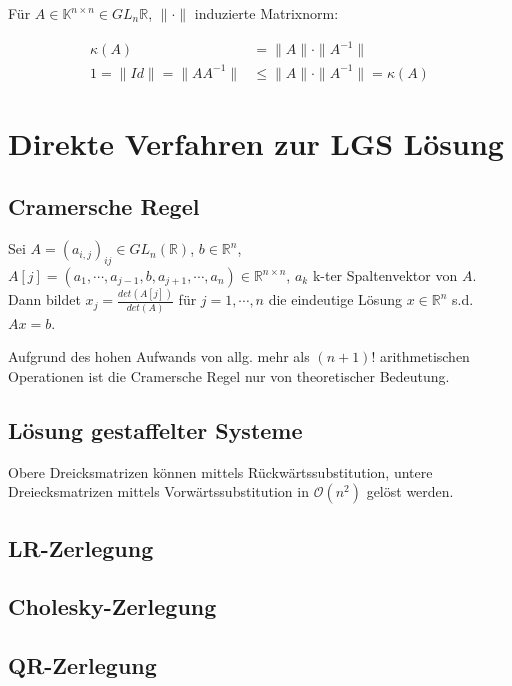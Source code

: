 Für $A \in \mathbb{K}^{n \times n} \in GL_n{\mathbb{R}}$, $\|\cdot\|$ induzierte Matrixnorm:

\vspace*{-4mm}
\begin{align*}
\kappa(A) &= \|A\| \cdot \|A^{-1}\| \\
1 = \|Id\| = \|AA^{-1}\| &\leq \|A\| \cdot \|A^{-1}\| = \kappa(A)
\end{align*}

\section*{Direkte Verfahren zur LGS Lösung}

\subsection*{Cramersche Regel}

Sei $A = (a_{i,j})_{ij} \in GL_n(\mathbb{R})$, $b \in \mathbb{R}^n$, $A[j] = (a_1, \cdots, a_{j-1}, b, a_{j+1}, \cdots, a_n) \in \mathbb{R}^{n \times n}$, $a_k$ k-ter Spaltenvektor von $A$. Dann bildet $x_j = \frac{det(A[j])}{det(A)}$ für $j = 1, \cdots, n$ die eindeutige Lösung $x \in \mathbb{R}^n$ s.d. $Ax=b$.

Aufgrund des hohen Aufwands von allg. mehr als $(n+1)!$ arithmetischen Operationen ist die Cramersche Regel nur von theoretischer Bedeutung.

\subsection*{Lösung gestaffelter Systeme}

Obere Dreicksmatrizen können mittels Rückwärtssubstitution, untere Dreiecksmatrizen mittels Vorwärtssubstitution in $\mathcal{O}(n^2)$ gelöst werden.

\subsection*{LR-Zerlegung}

\subsection*{Cholesky-Zerlegung}

\subsection*{QR-Zerlegung}

